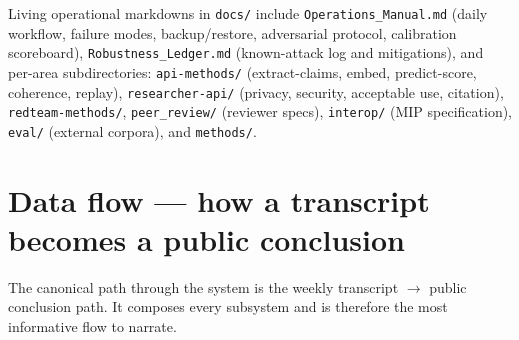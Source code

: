\documentclass[11pt,letterpaper]{article}
\newcommand{\file}[1]{\texttt{#1}}
\begin{document}
Living operational markdowns in \file{docs/} include \file{Operations\_Manual.md} (daily workflow, failure modes, backup/restore, adversarial protocol, calibration scoreboard), \file{Robustness\_Ledger.md} (known-attack log and mitigations), and per-area subdirectories: \file{api-methods/} (extract-claims, embed, predict-score, coherence, replay), \file{researcher-api/} (privacy, security, acceptable use, citation), \file{redteam-methods/}, \file{peer\_review/} (reviewer specs), \file{interop/} (MIP specification), \file{eval/} (external corpora), and \file{methods/}.

\section{Data flow --- how a transcript becomes a public conclusion}

The canonical path through the system is the weekly transcript $\to$ public conclusion path. It composes every subsystem and is therefore the most informative flow to narrate.
\end{document}
